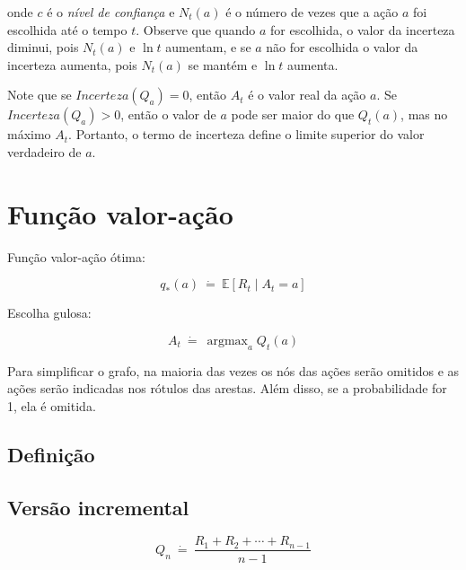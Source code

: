 \documentclass{article}
\DeclareMathOperator*{\argmax}{argmax}
\begin{document}
            \noindent
            onde $c$ é o \emph{nível de confiança} e $N_t(a)$ é o número de vezes que a ação $a$ foi escolhida até o tempo $t$. Observe que quando $a$ for escolhida, o valor da incerteza diminui, pois $N_t(a)$ e $\ln{t}$ aumentam, e se $a$ não for escolhida o valor da incerteza aumenta, pois $N_t(a)$ se mantém e $\ln{t}$ aumenta.
            
            Note que se $Incerteza(Q_a) = 0$, então $A_t$ é o valor real da ação $a$. Se $Incerteza(Q_a) > 0$, então o valor de $a$ pode ser maior do que $Q_t(a)$, mas no máximo $A_t$. Portanto, o termo de incerteza define o limite superior do valor verdadeiro de $a$.
            
    \section{Função valor-ação}
    
        Função valor-ação ótima:
    
        \begin{equation}
            q_*(a) \ \dot{=} \ \mathbb{E}[R_t \mid A_t = a]
        \end{equation}
    
        Escolha gulosa:
    
        \begin{equation}
            A_t \ \dot{=} \ \argmax_a Q_t(a)
        \end{equation}
        
        \begin{center}
        \mdpthreestate
        \end{center}
        
        Para simplificar o grafo, na maioria das vezes os nós das ações serão omitidos e as ações serão indicadas nos rótulos das arestas. Além disso, se a probabilidade for 1, ela é omitida.
        
        \subsection{Definição}
        
        \subsection{Versão incremental}
            
            \begin{equation}
                Q_n \ \dot{=} \ \frac{R_1 + R_2 + \cdots + R_{n-1}}{n - 1}
            \end{equation}
            
\end{document}
